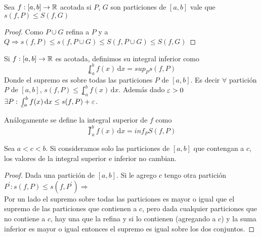 \begin{corollary}
  Sea $f: [a, b] \to \mathbb{R}$ acotada si $P$, $G$ son particiones de $[a, b]$ vale que $s(f, P) \leq S(f, G)$
  \begin{proof}
    Como $P \cup G$ refina a $P$ y a $Q \Rightarrow s(f, P) \leq s(f, P \cup G) \leq S(f, P \cup G) \leq S(f, G)$
  \end{proof}
\end{corollary}

\begin{definition}
  Si $f: [a, b] \to \mathbb{R}$ es acotada, definimos su integral inferior como \begin{equation} 
    \lowint_a^b f(x)\,\mathrm{d}x = sup_P s(f, P)
  \end{equation}
  Donde el supremo es sobre todas las particiones $P$ de $[a, b]$. Es decir $\forall$ partición $P$ de $[a, b]$, $s(f, P) \leq \lowint_a^b f(x)\, \mathrm{d}x$.
  Además dado $\varepsilon > 0$ $\exists P : \lowint_a^b f(x)\, \mathrm{d}x \leq s(f, P) + \e$.
\end{definition}

\begin{definition}
  Análogamente se define la integral superior de $f$ como \begin{equation}
    \upint_a^b f(x)\, \mathrm{d}x = inf_P S(f, P)
  \end{equation}
\end{definition}

\begin{lemma}
  Sea $a < c < b$. Si consideramos solo las particiones de $[a, b]$ que contengan a $c$, los valores de la integral superior e inferior no cambian.
  \begin{proof}
    Dada una partición de $[a, b]$. Si le agrego $c$ tengo otra partición $P^{\prime} : s(f, P) \leq s(f, P^{\prime}) \Rightarrow$ \\
    Por un lado el supremo sobre todas las particiones es mayor o igual que el supremo de las particiones que contienen a $c$, pero dada cualquier particiones que no contiene a $c$,
    hay una que la refina y si lo contienen (agregando a $c$) y la suma inferior es mayor o igual entonces el supremo es igual sobre los dos conjuntos.
  \end{proof}
\end{lemma}

